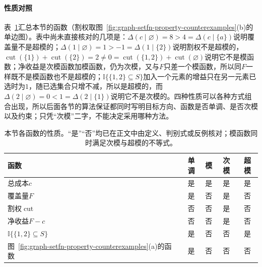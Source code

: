 \paragraph{性质对照}
表~\ref{tab:graph-setfn-property-summary}汇总本节的函数（割权取图~\ref{fig:graph-setfn-property-counterexamples}(b)的单边图）。表中尚未直接核对的几项是：$\Delta(c\mid\varnothing)=8>4=\Delta(c\mid\{a\})$说明覆盖量不是超模的；$\Delta(1\mid\varnothing)=1>-1=\Delta(1\mid\{2\})$说明割权不是超模的，$\operatorname{cut}(\{1\})+\operatorname{cut}(\{2\})=2\neq0=\operatorname{cut}(\{1,2\})+\operatorname{cut}(\varnothing)$说明它不是模函数；净收益是次模函数加模函数，仍为次模，又与$F$只差一个模函数，所以同$F$一样既不是模函数也不是超模的；$\mathbb I\{\{1,2\}\subseteq S\}$加入一个元素的增益只在另一元素已选时为$1$，随已选集合只增不减，所以是超模的，而$\Delta(2\mid\varnothing)=0<1=\Delta(2\mid\{1\})$说明它不是次模的。四种性质可以各种方式组合出现，所以后面各节的算法保证都同时写明目标方向、函数是否单调、是否次模以及约束；只凭“次模”二字，不能决定采用哪种方法。

\begin{table}[!htb]
  \centering
  \caption{本节各函数的性质。“是”“否”均已在正文中由定义、判别式或反例核对；模函数同时满足次模与超模的不等式。}
  \label{tab:graph-setfn-property-summary}
  \small
  \begin{tabular}{@{}lcccc@{}}
    \toprule
    函数 & 单调 & 模 & 次模 & 超模 \\
    \midrule
    总成本$c$ & 是 & 是 & 是 & 是 \\
    覆盖量$F$ & 是 & 否 & 是 & 否 \\
    割权$\operatorname{cut}$ & 否 & 否 & 是 & 否 \\
    净收益$F-c$ & 否 & 否 & 是 & 否 \\
    $\mathbb I\{\{1,2\}\subseteq S\}$ & 是 & 否 & 否 & 是 \\
    图~\ref{fig:graph-setfn-property-counterexamples}(a)的函数 & 是 & 否 & 否 & 否 \\
    \bottomrule
  \end{tabular}
\end{table}

